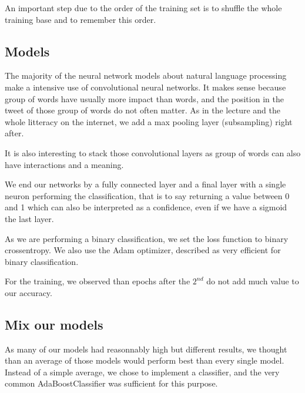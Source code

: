 \documentclass[10pt,conference,compsocconf]{IEEEtran}
\begin{document}
An important step due to the order of the training set is to shuffle the whole training base and to remember this order.

\subsection{Models}

The majority of the neural network models about natural language processing make a intensive use of convolutional neural networks. It makes sense because group of words have usually more impact than words, and the position in the tweet of those group of words do not often matter.
As in the lecture and the whole litteracy on the internet, we add a max pooling layer (subsampling) right after.

It is also interesting to stack those convolutional layers as group of words can also have interactions and a meaning.

We end our networks by a fully connected layer and a final layer with a single neuron performing the classification, that is to say returning a value between 0 and 1 which can also be interpreted as a confidence, even if we have a sigmoid the last layer.

As we are performing a binary classification, we set the loss function to binary crossentropy. We also use the Adam optimizer, described as very efficient for binary classification.

For the training, we observed than epochs after the $2^{nd}$ do not add much value to our accuracy.

\subsection{Mix our models}

As many of our models had reasonnably high but different results, we thought than an average of those models would perform best than every single model. Instead of a simple average, we chose to implement a classifier, and the very common AdaBoostClassifier was sufficient for this purpose.
\end{document}
